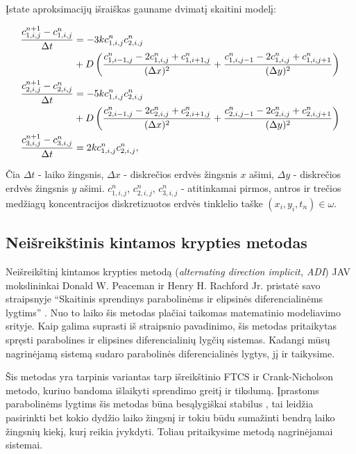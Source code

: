 Įstate aproksimacijų išraiškas gauname dvimatį skaitini modelį:

\begin{subequations} \label{numerical-eqs}
	\begin{align}
		\frac{c^{n+1}_{1,i,j}-c^n_{1,i,j}}{\Delta t} & =
		-3kc^{n}_{1,i,j}c^{n}_{2,i,j}\notag\\
        & +D\left(\frac{c^n_{1,i-1,j}-2c^n_{1,i,j}+c^n_{1,i+1,j}}{(\Delta x)^2}+\frac{c^n_{1,i,j-1}-2c^n_{1,i,j}+c^n_{1,i,j+1}}{(\Delta y)^2}\right) \\
		\frac{c^{n+1}_{2,i,j}-c^n_{2,i,j}}{\Delta t} & =
		-5kc^{n}_{1,i,j}c^{n}_{2,i,j}\notag\\
        &+D\left(\frac{c^n_{2,i-1,j}-2c^n_{2,i,j}+c^n_{2,i+1,j}}{(\Delta x)^2}+\frac{c^n_{2,i,j-1}-2c^n_{2,i,j}+c^n_{2,i,j+1}}{(\Delta y)^2}\right) \\
		\frac{c^{n+1}_{3,i,j}-c^n_{3,i,j}}{\Delta t} & =2kc^{n}_{1,i,j}c^{n}_{2,i,j},
	\end{align}
\end{subequations}

Čia
$\Delta t$ - laiko žingsnis,
$\Delta x$ - diskrečios erdvės žingsnis $x$ ašimi,
$\Delta y$ - diskrečios erdvės žingsnis $y$ ašimi.
$c^n_{1,i,j}$, $c^n_{2,i,j}$, $c^n_{3,i,j}$ - atitinkamai pirmos, antros ir trečios medžiagų koncentracijos diskretizuotos erdvės tinklelio taške $(x_i, y_i, t_n)\in\omega$.

\subsection{Neišreikštinis kintamos krypties metodas}

Neišreikštinį kintamos krypties metodą (\textit{alternating direction implicit, ADI}) JAV mokslininkai Donald W. Peaceman ir Henry H. Rachford Jr. pristatė savo straipsnyje \enquote{Skaitinis sprendinys parabolinėms ir elipsinės diferencialinėms lygtims} \cite{doi:10.1137/0103003}. Nuo to laiko šis metodas plačiai taikomas matematinio modeliavimo srityje. Kaip galima suprasti iš straipsnio pavadinimo, šis metodas pritaikytas spręsti parabolines ir elipsines diferencialinių lygčių sistemas. Kadangi mūsų nagrinėjamą sistemą sudaro parabolinės diferencialinės lygtys, jį ir taikysime.

Šis metodas yra tarpinis variantas tarp išreikštinio FTCS ir Crank-Nicholson metodo, kuriuo bandoma išlaikyti sprendimo greitį ir tikslumą. Įprastoms parabolinėms lygtims šis metodas būna besąlygiškai stabilus \cite{liAlternatingDirectionImplicit2021}, tai leidžia pasirinkti bet kokio dydžio laiko žingsnį ir tokiu būdu sumažinti bendrą laiko žingsnių kiekį, kurį reikia įvykdyti. Toliau pritaikysime metodą nagrinėjamai sistemai.

